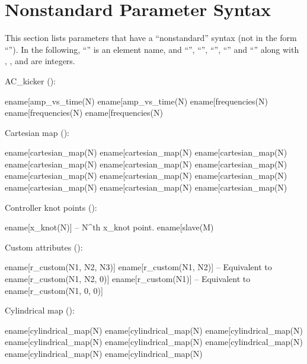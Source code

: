 {{{{{%
\section{Nonstandard Parameter Syntax}
\label{s:attrib.non}

This section lists parameters that have a ``nonstandard'' syntax (not in the form
``'').  In the following, ``'' is an element name, and ``'',
``'', ``'', ``'' and ``'' along with , , and  are
integers.

AC_kicker ():
\begin{example}
  ename[amp_vs_time(N)%
  ename[amp_vs_time(N)%
  ename[frequencies(N)%
  ename[frequencies(N)%
  ename[frequencies(N)%
\end{example}

Cartesian map ():
\begin{example}
  ename[cartesian_map(N)%
  ename[cartesian_map(N)%
  ename[cartesian_map(N)%
  ename[cartesian_map(N)%
  ename[cartesian_map(N)%
  ename[cartesian_map(N)%
  ename[cartesian_map(N)%
  ename[cartesian_map(N)%
  ename[cartesian_map(N)%
  ename[cartesian_map(N)%
  ename[cartesian_map(N)%
  ename[cartesian_map(N)%
\end{example}

Controller knot points ():
\begin{example}
  ename[x_knot(N)]                        -- N^th x_knot point.
  ename[slave(M)%
\end{example}

Custom attributes ():
\begin{example}
  ename[r_custom(N1, N2, N3)]
  ename[r_custom(N1, N2)]                 -- Equivalent to ename[r_custom(N1, N2,  0)]
  ename[r_custom(N1)]                     -- Equivalent to ename[r_custom(N1,  0,  0)]
\end{example}

Cylindrical map ():
\begin{example}
  ename[cylindrical_map(N)%
  ename[cylindrical_map(N)%
  ename[cylindrical_map(N)%
  ename[cylindrical_map(N)%
  ename[cylindrical_map(N)%
  ename[cylindrical_map(N)%
  ename[cylindrical_map(N)%
  ename[cylindrical_map(N)%
\end{example}

}}}}}
